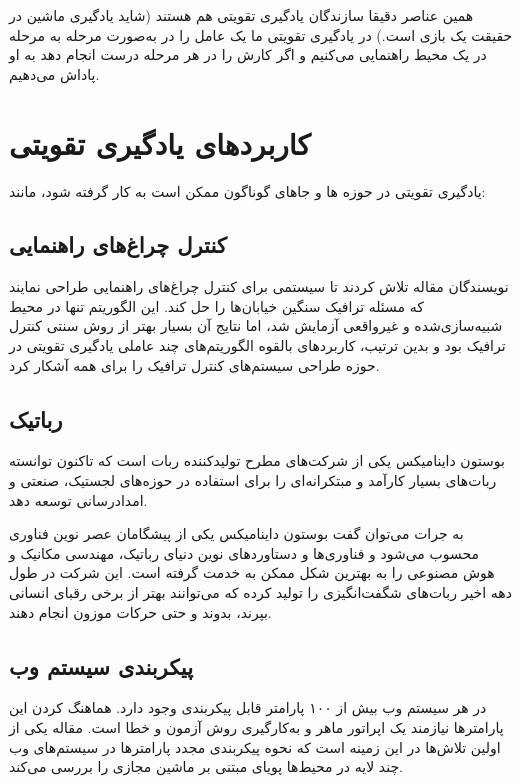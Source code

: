 \documentclass[12pt]{report}
\begin{document}
همین عناصر دقیقا سازندگان یادگیری تقویتی هم هستند (شاید یادگیری ماشین در حقیقت یک بازی است.) در یادگیری تقویتی ما یک عامل را در به‌صورت مرحله به مرحله در یک محیط راهنمایی می‌کنیم و اگر کارش را در هر مرحله درست انجام دهد به او پاداش می‌دهیم.

\section{کاربردهای یادگیری تقویتی}
یادگیری تقویتی در حوزه ها و جاهای گوناگون ممکن است به کار گرفته شود، مانند:

\subsection{کنترل چراغ‌های راهنمایی}

نویسندگان مقاله   تلاش کردند تا سیستمی برای کنترل چراغ‌های راهنمایی طراحی نمایند که مسئله ترافیک سنگین خیابان‌ها را حل کند. این الگوریتم تنها در محیط شبیه‌سازی‌شده و غیرواقعی آزمایش شد، اما نتایج آن بسیار بهتر از روش سنتی کنترل ترافیک بود و بدین ترتیب، کاربردهای بالقوه الگوریتم‌های چند عاملی یادگیری تقویتی در حوزه طراحی سیستم‌های کنترل ترافیک را برای همه آشکار کرد.

\subsection{رباتیک}
بوستون داینامیکس  یکی از شرکت‌های مطرح تولیدکننده ربات است که تاکنون توانسته ربات‌های بسیار کارآمد و مبتکرانه‌ای را برای استفاده در حوزه‌های لجستیک، صنعتی و امدادرسانی توسعه دهد.

به جرات می‌توان گفت بوستون داینامیکس یکی از پیشگامان عصر نوین فناوری محسوب می‌شود و فناوری‌ها و دستاوردهای نوین دنیای رباتیک، مهندسی مکانیک و هوش مصنوعی را به بهترین شکل ممکن به خدمت گرفته است. این شرکت در طول دهه اخیر ربات‌های شگفت‌انگیزی را تولید کرده که می‌توانند بهتر از برخی رقبای انسانی بپرند، بدوند و حتی حرکات موزون انجام دهند.

\subsection{پیکربندی سیستم وب}

در هر سیستم وب بیش از ۱۰۰ پارامتر قابل پیکربندی وجود دارد. هماهنگ کردن این پارامترها نیازمند یک اپراتور ماهر و به‌کارگیری روش آزمون و خطا است. مقاله   یکی از اولین تلاش‌ها در این زمینه است که نحوه پیکربندی مجدد پارامترها در
سیستم‌های وب چند لایه در محیط‌ها پویای مبتنی بر ماشین مجازی را بررسی می‌کند.
\end{document}
